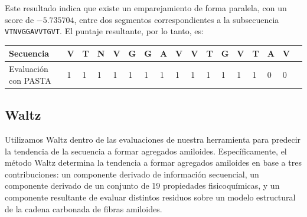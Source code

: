 Este resultado indica que existe un emparejamiento de forma paralela, con un score de $-5.735704$, entre dos segmentos correspondientes a la subsecuencia \texttt{VTNVGGAVVTGVT}. 
El puntaje resultante, por lo tanto, es:

\begin{center}
\begin{adjustbox}{width=\textwidth}
\begin{tabular}{lllllllllllllllll} 
\hline    
Secuencia & \textbf{V} & \textbf{T} & \textbf{N} & \textbf{V} & \textbf{G} & \textbf{G} & \textbf{A} & \textbf{V} & \textbf{V} &\textbf{T} & \textbf{G} & \textbf{V} & \textbf{T} & \textbf{A} & \textbf{V} \\ \hline
Evaluación con PASTA & 1 & 1 & 1 & 1 & 1 & 1 & 1 & 1 & 1 & 1 & 1 & 1 & 1 & 0 & 0 \\ \hline
\end{tabular}
\end{adjustbox}
\end{center}


















\subsection{Waltz}\label{waltz}

Utilizamos Waltz \cite{maurer2010exploring} dentro de las evaluaciones de nuestra herramienta para predecir la tendencia de la secuencia a formar agregados amiloides.
Específicamente, el método Waltz determina la tendencia a formar agregados amiloides en base a 
tres contribuciones: un componente derivado de información secuencial, un componente derivado de un conjunto de 19 propiedades fisicoquímicas, 
y un componente resultante de evaluar distintos residuos sobre un modelo estructural de la cadena carbonada de fibras amiloides.

